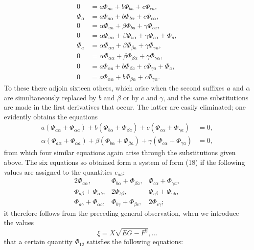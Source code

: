 \documentclass[11pt,a4paper,leqno]{article}
\begin{document}
\begin{equation}\tag{19}
\begin{aligned}
0&=a\Phi_{aa}+b\Phi_{ba}+c\Phi_{ca},\\
\Phi_\alpha&=a\Phi_{a\alpha}+b\Phi_{b\alpha}+c\Phi_{c\alpha},\\
0&=\alpha\Phi_{aa}+\beta\Phi_{ba}+\gamma\Phi_{ca},\\
0&=\alpha\Phi_{a\alpha}+\beta\Phi_{b\alpha}+\gamma\Phi_{c\alpha}+\Phi_a,\\
\Phi_a&=\alpha\Phi_{\alpha a}+\beta\Phi_{\beta a}+\gamma\Phi_{\gamma a},\\
0&=\alpha\Phi_{\alpha\alpha}+\beta\Phi_{\beta\alpha}+\gamma\Phi_{\gamma\alpha},\\
0&=a\Phi_{\alpha a}+b\Phi_{\beta a}+c\Phi_{\gamma a}+\Phi_a,\\
0&=a\Phi_{\alpha\alpha}+b\Phi_{\beta\alpha}+c\Phi_{\gamma\alpha}.
\end{aligned}
\end{equation}
To these there adjoin sixteen others, which arise when the second
suffixes $a$ and $\alpha$ are simultaneously replaced by $b$ and $\beta$
or by $c$ and $\gamma$, and the same substitutions are made in the first
derivatives that occur. The latter are easily eliminated; one evidently
obtains the equations
\[
\begin{aligned}
a(\Phi_{a\alpha}+\Phi_{\alpha a})
+b(\Phi_{b\alpha}+\Phi_{\beta a})
+c(\Phi_{c\alpha}+\Phi_{\gamma a})&=0,\\
\alpha(\Phi_{a\alpha}+\Phi_{\alpha a})
+\beta(\Phi_{b\alpha}+\Phi_{\beta a})
+\gamma(\Phi_{c\alpha}+\Phi_{\gamma a})&=0,
\end{aligned}
\]
from which four similar equations again arise through the substitutions
given above. The six equations so obtained form a system of form (18)
if the following values are assigned to the quantities $e_{ab}$:
\[
\begin{array}{ccc}
2\Phi_{a\alpha},&\Phi_{b\alpha}+\Phi_{\beta a},&\Phi_{c\alpha}+\Phi_{\gamma a},\\
\Phi_{a\beta}+\Phi_{\alpha b},&2\Phi_{b\beta},&\Phi_{c\beta}+\Phi_{\gamma b},\\
\Phi_{a\gamma}+\Phi_{\alpha c},&\Phi_{b\gamma}+\Phi_{\beta c},&2\Phi_{c\gamma};
\end{array}
\]
it therefore follows from the preceding general observation, when
we introduce the values
\[
\xi=X\sqrt{EG-F^2},\ldots
\]
that a certain quantity $\Phi_{12}$ satisfies the following equations:
\end{document}
